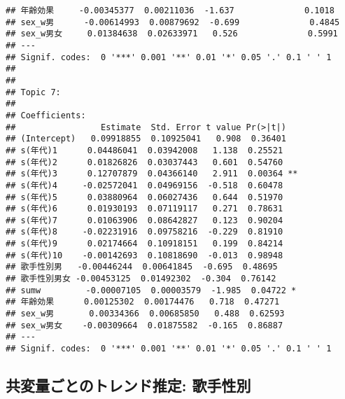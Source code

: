 \documentclass[
]{article}
\begin{document}
\begin{verbatim}
## 年齢効果     -0.00345377  0.00211036  -1.637              0.1018    
## sex_w男      -0.00614993  0.00879692  -0.699              0.4845    
## sex_w男女     0.01384638  0.02633971   0.526              0.5991    
## ---
## Signif. codes:  0 '***' 0.001 '**' 0.01 '*' 0.05 '.' 0.1 ' ' 1
## 
## 
## Topic 7:
## 
## Coefficients:
##                 Estimate  Std. Error t value Pr(>|t|)   
## (Intercept)   0.09918855  0.10925041   0.908  0.36401   
## s(年代)1      0.04486041  0.03942008   1.138  0.25521   
## s(年代)2      0.01826826  0.03037443   0.601  0.54760   
## s(年代)3      0.12707879  0.04366140   2.911  0.00364 **
## s(年代)4     -0.02572041  0.04969156  -0.518  0.60478   
## s(年代)5      0.03880964  0.06027436   0.644  0.51970   
## s(年代)6      0.01930193  0.07119117   0.271  0.78631   
## s(年代)7      0.01063906  0.08642827   0.123  0.90204   
## s(年代)8     -0.02231916  0.09758216  -0.229  0.81910   
## s(年代)9      0.02174664  0.10918151   0.199  0.84214   
## s(年代)10    -0.00142693  0.10818690  -0.013  0.98948   
## 歌手性別男   -0.00446244  0.00641845  -0.695  0.48695   
## 歌手性別男女 -0.00453125  0.01492302  -0.304  0.76142   
## sumw         -0.00007105  0.00003579  -1.985  0.04722 * 
## 年齢効果      0.00125302  0.00174476   0.718  0.47271   
## sex_w男       0.00334366  0.00685850   0.488  0.62593   
## sex_w男女    -0.00309664  0.01875582  -0.165  0.86887   
## ---
## Signif. codes:  0 '***' 0.001 '**' 0.01 '*' 0.05 '.' 0.1 ' ' 1
\end{verbatim}

\hypertarget{ux5171ux5909ux91cfux3054ux3068ux306eux30c8ux30ecux30f3ux30c9ux63a8ux5b9a-ux6b4cux624bux6027ux5225}{%
\subsection{共変量ごとのトレンド推定:
歌手性別}\label{ux5171ux5909ux91cfux3054ux3068ux306eux30c8ux30ecux30f3ux30c9ux63a8ux5b9a-ux6b4cux624bux6027ux5225}}
\end{document}
